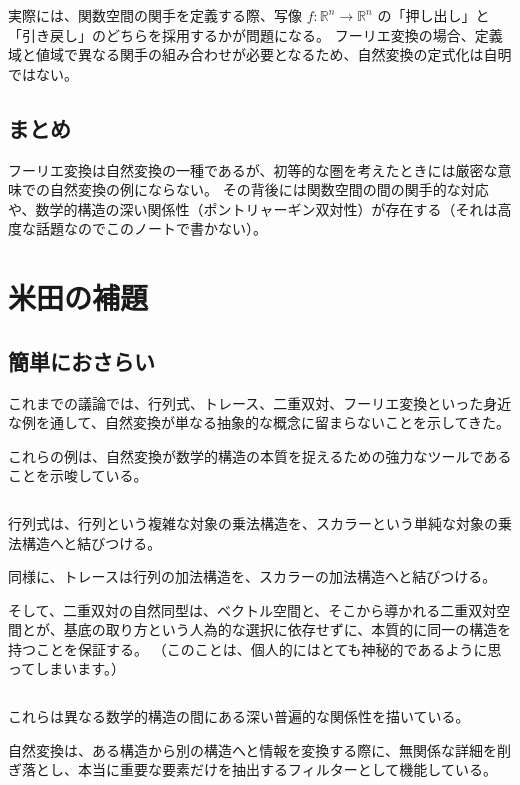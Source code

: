 \documentclass[uplatex,a4j,12pt,dvipdfmx]{jsarticle}
\begin{document}
実際には、関数空間の関手を定義する際、写像 $f: \mathbb{R}^n \to \mathbb{R}^n$ の「押し出し」と「引き戻し」のどちらを採用するかが問題になる。
フーリエ変換の場合、定義域と値域で異なる関手の組み合わせが必要となるため、自然変換の定式化は自明ではない。

\subsection{まとめ}

フーリエ変換は自然変換の一種であるが、初等的な圏を考えたときには厳密な意味での自然変換の例にならない。
その背後には関数空間の間の関手的な対応や、数学的構造の深い関係性（ポントリャーギン双対性）が存在する（それは高度な話題なのでこのノートで書かない）。







\section{米田の補題}

\subsection{簡単におさらい}

これまでの議論では、行列式、トレース、二重双対、フーリエ変換といった身近な例を通して、自然変換が単なる抽象的な概念に留まらないことを示してきた。

これらの例は、自然変換が数学的構造の本質を捉えるための強力なツールであることを示唆している。

${}$

行列式は、行列という複雑な対象の乗法構造を、スカラーという単純な対象の乗法構造へと結びつける。

同様に、トレースは行列の加法構造を、スカラーの加法構造へと結びつける。

そして、二重双対の自然同型は、ベクトル空間と、そこから導かれる二重双対空間とが、基底の取り方という人為的な選択に依存せずに、本質的に同一の構造を持つことを保証する。
（このことは、個人的にはとても神秘的であるように思ってしまいます。）

${}$

これらは異なる数学的構造の間にある深い普遍的な関係性を描いている。

自然変換は、ある構造から別の構造へと情報を変換する際に、無関係な詳細を削ぎ落とし、本当に重要な要素だけを抽出するフィルターとして機能している。
\end{document}
